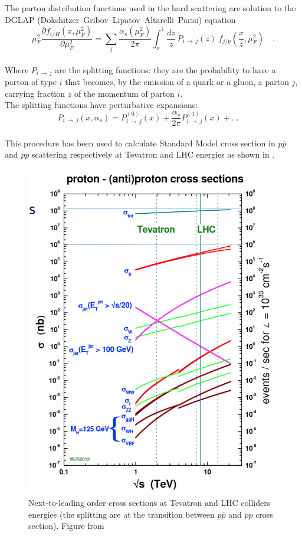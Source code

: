 The parton distribution functions used in the hard scattering are solution to the DGLAP (Dokshitzer–Gribov–Lipatov–Altarelli–Parisi) equation \cite{Lipatov:400357, Gribov:427157, ALTARELLI1977298, Dokshitzer:1977sg}
\\
\begin{equation}
	\mu_F^2\frac{\partial f_{i/H}(x,\mu_F^2)}{\partial\mu_F^2}=\displaystyle\sum_j\frac{\alpha_s(\mu_F^2)}{2\pi}\displaystyle\int_x^1 \frac{dz}{z}\, P_{i\,\rightarrow\,j}(z)\ f_{j/p}\left(\frac{x}{z},\mu_F^2\right)\quad .
\end{equation}
\\
Where $P_{i\,\rightarrow\,j}$ are the splitting functions: they are the probability to have a parton of type $i$ that becomes, by the emission of a quark or a gluon, a parton $j$, carrying fraction $z$ of the momentum of parton $i$.
\\
The splitting functions have perturbative expansions: 
\begin{equation}
	P_{i\,\rightarrow\,j}(x,\alpha_s)=P_{i\,\rightarrow\,j}^{(0)}(x)+\frac{\alpha_s}{2\pi}P_{i\,\rightarrow\,j}^{(1)}(x)+\dots\quad .
\end{equation}
\\
This procedure has been used to calculate Standard Model cross section in $p\overline{p}$ and $pp$ scattering respectively at Tevatron and LHC energies as shown in .

\begin{figure}[!ht]
	\centering 
	\includegraphics[width=12cm]{img/StandardModelCrossSections_color.png}
	\caption{Next-to-leading order cross sections at Tevatron and LHC colliders energies (the splitting are at the transition between $p\overline{p}$ and $pp$ cross section). Figure from \cite{StirlingPrivate}}
	\label{figure:StandardModelCrossSections}
\end{figure}

